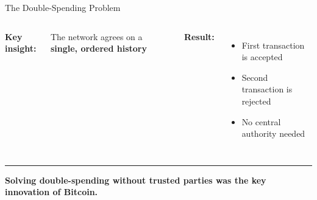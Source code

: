 \documentclass[8pt,aspectratio=169]{beamer}
\newcommand{\bottomnote}[1]{%
\vfill
\vspace{-2mm}
\textcolor{mllavender2}{\rule{\textwidth}{0.4pt}}
\vspace{1mm}
\footnotesize
\textbf{#1}
}
\begin{document}
\begin{frame}[t]{The Double-Spending Problem}
\begin{columns}[T]
\vspace{0.5em}
\textbf{Key insight:}

The network agrees on a \textcolor{mlpurple}{\textbf{single, ordered history}}

\vspace{0.5em}
\textbf{Result:}
\begin{itemize}
\item First transaction is accepted
\item Second transaction is rejected
\item No central authority needed
\end{itemize}
\end{columns}

\bottomnote{Solving double-spending without trusted parties was the key innovation of Bitcoin.}
\end{frame}
\end{document}
